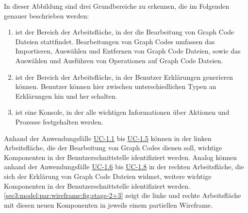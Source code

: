 In dieser Abbildung sind drei Grundbereiche zu erkennen, die im Folgenden genauer beschrieben werden:
\begin{enumerate}
    \item[\circitem{1}] ist der Bereich der Arbeitsfläche, in der die Bearbeitung von Graph Code Dateien stattfindet.
    Bearbeitungen von Graph Codes umfassen das Importieren, Auswählen und Entfernen von Graph Code Dateien, sowie das Auswählen und Ausführen von Operationen auf Graph Code Dateien.
    \item[\circitem{2}] ist der Bereich der Arbeitsfläche, in der Benutzer Erklärungen generieren können.
    Benutzer können hier zwischen unterschiedlichen Typen an Erklärungen hin und her schalten.
    \item[\circitem{3}] ist eine Konsole, in der alle wichtigen Informationen über Aktionen und Prozesse festgehalten werden.
\end{enumerate}
Anhand der Anwendungsfälle \hyperref[sec3:model:uc-1.1]{UC-1.1} bis \hyperref[sec3:model:uc-1.5]{UC-1.5} können in der linken Arbeitsfläche, die der Bearbeitung von Graph Codes dienen soll, wichtige Komponenten in der Benutzerschnittstelle identifiziert werden.
Analog können anhand der Anwendungsfälle \hyperref[sec3:model:uc-1.6]{UC-1.6} bis \hyperref[sec3:model:uc-1.8]{UC-1.8} in der rechten Arbeitsfläche, die sich der Erklärung von Graph Code Dateien widmet, weitere wichtige Komponenten in der Benutzerschnittstelle identifiziert werden.
\cref{sec3:model:par:wireframe:fig:stage-2+3} zeigt die linke und rechte Arbeitsfläche mit diesen neuen Komponenten in jeweils einem partiellen Wireframe.

